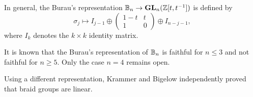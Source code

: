 In general, the Burau's representation
$\mathbb{B}_n\to\mathbf{GL}_{n}(\mathbb{Z}[t,t^{-1}])$ 
is defined
by
\[
\sigma_j\mapsto
I_{j-1}\oplus
\begin{pmatrix}
1-t & t\\
1 & 0
\end{pmatrix}
\oplus
I_{n-j-1},
\]
where $I_k$ denotes the $k\times k$ identity matrix. 

It is known that the Burau's representation of $\mathbb{B}_n$ is faithful
for $n\leq3$ and not faithful for $n\geq5$. Only the case
$n=4$ remains open.

Using a different representation,  
Krammer \cite{MR1888796} and Bigelow \cite{MR1815219} 
independently proved that braid groups are linear. 

